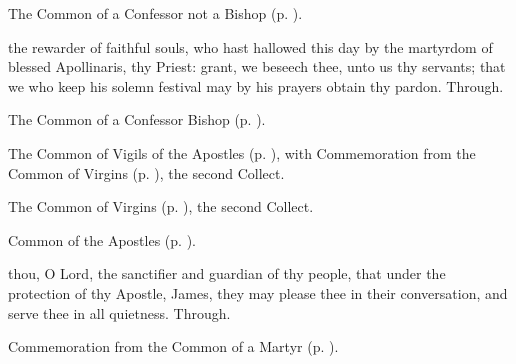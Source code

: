 
\begin{rubric}
	The Common of a Confessor not a Bishop (p. \pageref{AbbotCollect}).
\end{rubric}



\memorialCollect
{} the rewarder of faithful souls, who hast hallowed this day by the martyrdom of blessed Apollinaris, thy Priest: grant, we beseech thee, unto us thy servants; that we who keep his solemn festival may by his prayers obtain thy pardon. Through.


\clearpage
{}

\begin{rubric}
	The Common of a Confessor Bishop (p. \pageref{ConfessorBishopCollect}).
\end{rubric}



\begin{rubric}
	The Common of Vigils of the Apostles (p. \pageref{CommonVigilApostles}), with Commemoration  from the Common of Virgins (p. \pageref{CommonVirgin}), the second Collect.
\end{rubric}



\begin{rubric}
	The Common of Virgins (p. \pageref{VirginMartyressCollect}), the second Collect.
\end{rubric}



\begin{rubric}
	Common of the Apostles (p. \pageref{CommonApostles}).
\end{rubric}

{} thou, O Lord, the sanctifier and guardian of thy people, that under the protection of thy Apostle, James, they may please thee in their conversation, and serve thee in all quietness. Through.
\begin{rubric}
	 Commemoration  from the Common of a Martyr (p. \pageref{CommonMartyrNotBishopCollect}).
\end{rubric}


